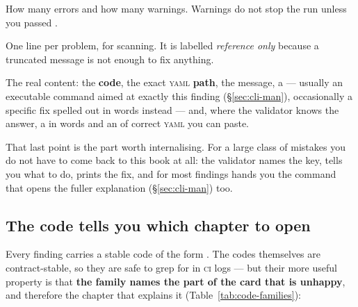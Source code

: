 \begin{keylist}
  \item[the count line] How many errors and how many warnings. Warnings do not stop the
        run unless you passed .
  \item[the summary table] One line per problem, for scanning. It is labelled
        \emph{reference only} because a truncated message is not enough to fix anything.
  \item[the detailed diagnostics] The real content: the \textbf{code}, the exact
        \textsc{yaml} \textbf{path}, the message, a  --- usually an
        executable  command aimed at exactly this finding
        (\S\ref{sec:cli-man}), occasionally a specific fix spelled out in words instead
        --- and, where the validator knows the answer, a  in words and
        an  of correct \textsc{yaml} you can paste.
\end{keylist}

That last point is the part worth internalising. For a large class of mistakes you do not
have to come back to this book at all: the validator names the key, tells you what to do,
prints the fix, and for most findings hands you the command that opens the fuller
explanation (\S\ref{sec:cli-man}) too.

\subsection{The code tells you which chapter to open}
\label{sec:code-families}

Every finding carries a stable code of the form . The codes
themselves are contract-stable, so they are safe to grep for in \textsc{ci} logs --- but
their more useful property is that \textbf{the family names the part of the card that is
unhappy}, and therefore the chapter that explains it (Table~\ref{tab:code-families}):

